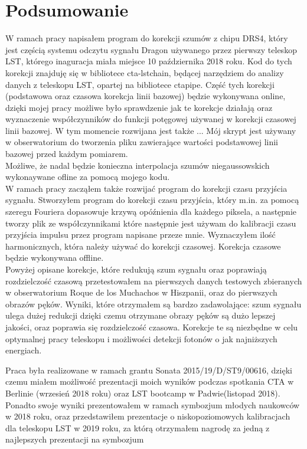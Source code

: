 \documentclass[a4paper,11pt,twoside]{article}
\begin{document}
\section{Podsumowanie}
W ramach pracy napisałem program do korekcji szumów z chipu DRS4, który jest częścią systemu odczytu sygnału Dragon używanego przez pierwszy teleskop LST, którego inaguracja miała miejsce 10 października 2018 roku. Kod do tych korekcji znajduję się w bibliotece cta-lstchain, będącej narzędziem do analizy danych z teleskopu LST, opartej na bibliotece ctapipe. Część tych korekcji (podstawowa oraz czasowa korekcja linii bazowej) będzie wykonywana online, dzięki mojej pracy możliwe było sprawdzenie jak te korekcje działają oraz wyznaczenie współczynników do funkcji potęgowej używanej w korekcji czasowej linii bazowej. W tym momencie rozwijana jest także ... Mój skrypt jest używany w obserwatorium do tworzenia pliku  zawierające wartości podstawowej linii bazowej przed każdym pomiarem. \\
Możliwe, że nadal będzie konieczna interpolacja szumów niegaussowskich wykonaywane ofline za pomocą mojego kodu. \\
W ramach pracy zacząłem także rozwijać program do korekcji czasu przyjścia sygnału. Stworzyłem program do korekcji czasu przyjścia, który m.in. za pomocą szeregu Fouriera dopasowuje krzywą opóźnienia dla każdego piksela, a następnie tworzy plik ze współczynnikami które następnie jest używam do kalibracji czasu przyjścia impulsu przez program napisane przeze mnie. Wyznaczyłem ilość harmonicznych, która należy używać do korekcji czasowej. Korekcja czasowe będzie wykonywana offline.\\
Powyżej opisane korekcje, które redukują szum sygnału oraz poprawiają rozdzielczość czasową przetestowałem na pierwszych danych testowych zbieranych w obserwatorium Roque de los Muchachos w Hiszpanii, oraz do pierwszych obrazów pęków.  
Wyniki, które otrzymałem są bardzo zadawolające: szum sygnału ulega dużej redukcji dzięki czemu otrzymane obrazy pęków są dużo lepszej jakości, oraz poprawia się rozdzielczość czasowa. 
Korekcje te są niezbędne w celu optymalnej pracy teleskopu i możliwości detekcji fotonów o jak najniższych energiach. 

Praca była realizowane w ramach grantu Sonata 2015/19/D/ST9/00616, dzięki czemu miałem możliwość prezentacji moich wyników podczas spotkania CTA w Berlinie (wrzesień 2018 roku) oraz LST bootcamp w Padwie(listopad 2018). Ponadto swoje wyniki prezentowałem w ramach symbozjum młodych naukowców w 2018 roku, oraz przedstawiłem prezentacje o niskopoziomowych kalibracjach dla teleskopu LST w 2019 roku, za którą otrzymałem nagrodę za jedną z najlepszych prezentacji na symbozjum 
\end{document}
